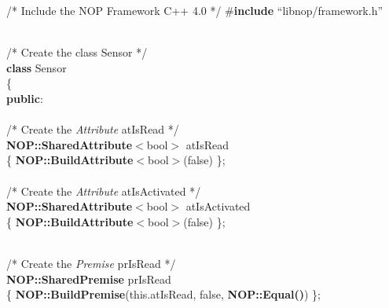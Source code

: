 \begin{algorithm*}
\caption{Exemplo de instruções usando NOP Framework C++ para o \textit{FBE} Sensor e \textit{Rule} rlSensorTrigger apresentados na Figura~\ref{fig:examplerule}}
  \label{alg:frameworkc++}
  \begin{algorithmic}[1]
\STATE /* Include the NOP Framework C++ 4.0 */ 
\STATE \#\textbf{include} ``libnop\//framework.h''

\STATE \texttt{\\}
\STATE /* Create the class Sensor */ \\
\STATE \textbf{class} Sensor \\ 
\STATE \{ \\
\STATE \hspace{0.cm} \textbf{public}: \\
\STATE \texttt{\\}
\STATE \hspace{0.1cm} /* Create the \textit{Attribute} atIsRead */ \\
\STATE \hspace{0.1cm} \textbf{NOP::SharedAttribute}$<$bool$>$ atIsRead \\
\STATE \hspace{0.1cm} \{ \textbf{NOP::BuildAttribute}$<$bool$>$(false) \}; \\
\STATE \texttt{\\}
\STATE \hspace{0.1cm} /* Create the \textit{Attribute} atIsActivated */ \\
\STATE \hspace{0.1cm} \textbf{NOP::SharedAttribute}$<$bool$>$ atIsActivated \\ 
\STATE \hspace{0.1cm} \{ \textbf{NOP::BuildAttribute}$<$bool$>$(false) \}; \\

\STATE \texttt{\\}

\STATE \hspace{0.1cm} /* Create the \textit{Premise} prIsRead */ \\
\STATE \hspace{0.1cm} \textbf{NOP::SharedPremise} prIsRead \\
\STATE \hspace{0.1cm} \{ \textbf{NOP::BuildPremise}(this.atIsRead, false, \textbf{NOP::Equal()}) \}; \\

\STATE \texttt{\\}


\end{algorithmic}
\end{algorithm*}
